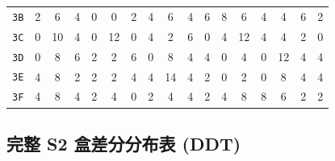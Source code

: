 \begin{center}
\begin{small}
\begin{longtable}{c|cccccccccccccccc}
\texttt{3B} & 2 & 6 & 4 & 0 & 0 & 2 & 4 & 6 & 4 & 6 & 8 & 6 & 4 & 4 & 6 & 2 \\
\texttt{3C} & 0 & 10 & 4 & 0 & 12 & 0 & 4 & 2 & 6 & 0 & 4 & 12 & 4 & 4 & 2 & 0 \\
\texttt{3D} & 0 & 8 & 6 & 2 & 2 & 6 & 0 & 8 & 4 & 4 & 0 & 4 & 0 & 12 & 4 & 4 \\
\texttt{3E} & 4 & 8 & 2 & 2 & 2 & 4 & 4 & 14 & 4 & 2 & 0 & 2 & 0 & 8 & 4 & 4 \\
\texttt{3F} & 4 & 8 & 4 & 2 & 4 & 0 & 2 & 4 & 4 & 2 & 4 & 8 & 8 & 6 & 2 & 2 \\ \bottomrule
\end{longtable}
\end{small}
\end{center}

\subsection{完整 S2 盒差分分布表 (DDT)}
